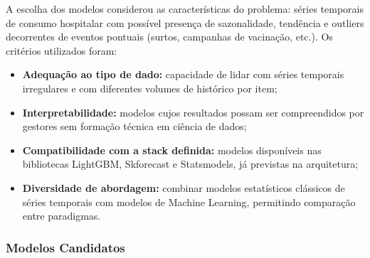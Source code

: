 \documentclass[12pt,a4paper]{article}
\begin{document}
A escolha dos modelos considerou as características do problema:
séries temporais de consumo hospitalar com possível presença de
sazonalidade, tendência e outliers decorrentes de eventos pontuais
(surtos, campanhas de vacinação, etc.). Os critérios utilizados foram:

\begin{itemize}
    \item \textbf{Adequação ao tipo de dado:} capacidade de lidar com
          séries temporais irregulares e com diferentes volumes de histórico por
          item;
    \item \textbf{Interpretabilidade:} modelos cujos resultados possam ser
          compreendidos por gestores sem formação técnica em ciência de dados;
    \item \textbf{Compatibilidade com a stack definida:} modelos disponíveis
          nas bibliotecas LightGBM, Skforecast e Statsmodels, já previstas na arquitetura;
    \item \textbf{Diversidade de abordagem:} combinar modelos estatísticos
          clássicos de séries temporais com modelos de Machine Learning, permitindo
          comparação entre paradigmas.
\end{itemize}

\subsubsection{Modelos Candidatos}
\end{document}
